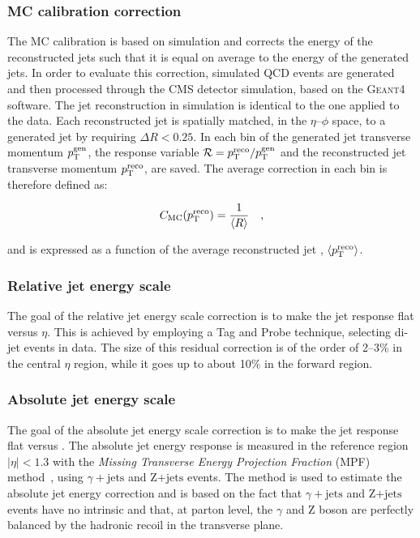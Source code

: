 \subsubsection{MC calibration correction}

The MC calibration is based on simulation and corrects the energy of the reconstructed jets such that it is equal on average to the energy of the generated jets. In order to evaluate this correction, simulated QCD events are generated and then processed through the CMS detector simulation, based on the \textsc{Geant4} software. The jet reconstruction in simulation is identical to the one applied to the data. Each reconstructed jet is spatially matched, in the $\eta$--$\phi$ space, to a generated jet by requiring $\Delta R < 0.25$. In each bin of the generated jet transverse momentum $p_\mathrm{T}^\mathrm{gen}$, the response variable $\mathcal{R}=p_\mathrm{T}^\mathrm{reco}/p_\mathrm{T}^\mathrm{gen}$ and the reconstructed jet transverse momentum $p_\mathrm{T}^\mathrm{reco}$, are saved. The average correction in each bin is therefore defined as:

\begin{equation}
C_\mathrm{MC}(p_\mathrm{T}^\mathrm{reco}) = \frac{1}{\langle R \rangle} \quad,
\end{equation}

\noindent and is expressed as a function of the average reconstructed jet \pt, $\langle p_\mathrm{T}^\mathrm{reco} \rangle$.

\subsubsection{Relative jet energy scale}

The goal of the relative jet energy scale correction is to make the jet response flat versus $\eta$. This is achieved by employing a Tag and Probe technique, selecting di-jet events in data. The size of this residual correction is of the order of 2--3\% in the central $\eta$ region, while it goes up to about 10\% in the forward region.

\subsubsection{Absolute jet energy scale}

The goal of the absolute jet energy scale correction is to make the jet response flat versus \pt. The absolute jet energy response is measured in the reference region $|\eta|<1.3$ with the \emph{Missing Transverse Energy Projection Fraction} (MPF) method~\cite{Abbott:1998xw}, using $\gamma+\mathrm{jets}$ and Z$+\mathrm{jets}$ events. The method is used to estimate the absolute jet energy correction and is based on the fact that $\gamma+\mathrm{jets}$ and Z$+\mathrm{jets}$ events have no intrinsic \MET and that, at parton level, the $\gamma$ and Z boson are perfectly balanced by the hadronic recoil in the transverse plane.

